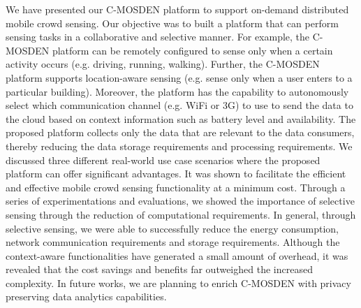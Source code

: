 \documentclass[journal]{IEEEtran}
\newcommand{\platform}{C-MOSDEN }
\begin{document}
We have presented our \platform platform to support on-demand distributed mobile crowd sensing. Our objective was to built a platform that can perform sensing tasks in a collaborative and selective manner. For example, the \platform platform can be remotely configured to sense only when a certain activity occurs (e.g. driving, running, walking).  Further, the C-MOSDEN platform supports location-aware sensing (e.g. sense only when a user enters to a particular building). Moreover, the platform  has the capability to autonomously select which communication channel (e.g. WiFi or 3G) to use to send the data to the cloud based on context information such as battery level and availability. The proposed platform collects only the data that are relevant to the data consumers, thereby reducing the data storage requirements and processing requirements. We discussed three different real-world use case scenarios where the proposed platform can offer significant advantages. It was shown to  facilitate the efficient and effective mobile crowd sensing functionality at a  minimum cost. Through a series of experimentations and evaluations, we showed the importance of selective sensing through the reduction  of computational requirements. In general, through selective sensing,  we were able to successfully reduce the energy consumption, network communication requirements and storage requirements. Although the context-aware functionalities have generated a small amount of overhead, it was revealed that the  cost savings and benefits   far outweighed the increased complexity. In future works, we are planning to enrich C-MOSDEN with privacy preserving data analytics capabilities.












\ifCLASSOPTIONcaptionsoff
  \newpage
\fi













\def\IEEEbibitemsep{0pt plus .5pt}






\vspace{-30pt}
\end{document}
